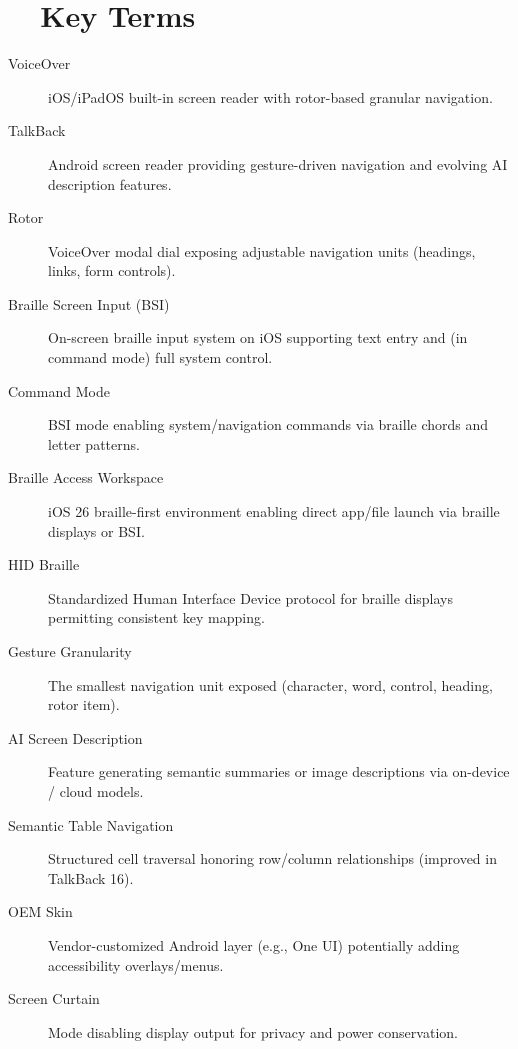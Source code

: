 \section{~~Key Terms}
\label{sec:sr26-key-terms}
\begin{description}
	\item[VoiceOver] iOS/iPadOS built-in screen reader with rotor-based granular navigation.
	\item[TalkBack] Android screen reader providing gesture-driven navigation and evolving AI description features.
	\item[Rotor] VoiceOver modal dial exposing adjustable navigation units (headings, links, form controls).
	\item[Braille Screen Input (BSI)] On-screen braille input system on iOS supporting text entry and (in command mode) full system control.
	\item[Command Mode] BSI mode enabling system/navigation commands via braille chords and letter patterns.
	\item[Braille Access Workspace] iOS 26 braille-first environment enabling direct app/file launch via braille displays or BSI.
	\item[HID Braille] Standardized Human Interface Device protocol for braille displays permitting consistent key mapping.
	\item[Gesture Granularity] The smallest navigation unit exposed (character, word, control, heading, rotor item).
	\item[AI Screen Description] Feature generating semantic summaries or image descriptions via on-device / cloud models.
	\item[Semantic Table Navigation] Structured cell traversal honoring row/column relationships (improved in TalkBack 16).
	\item[OEM Skin] Vendor-customized Android layer (e.g., One UI) potentially adding accessibility overlays/menus.
	\item[Screen Curtain] Mode disabling display output for privacy and power conservation.
\end{description}

